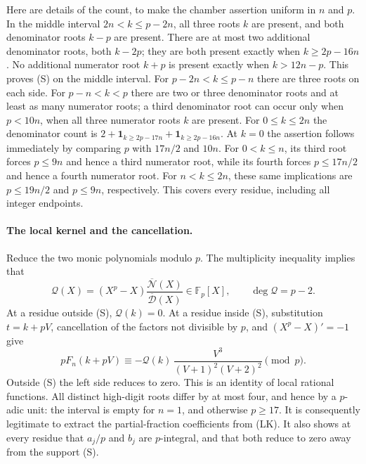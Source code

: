 \documentclass[11pt]{article}
\begin{document}
Here are details of the count, to make the chamber assertion uniform in
$n$ and $p$.  In the middle interval $2n<k\le p-2n$, all three roots $k$
are present, and both denominator roots $k-p$ are present.  There are at
most two additional denominator roots, both $k-2p$; they are both present
exactly when $k\ge2p-16n$.  No additional numerator root $k+p$ is present
exactly when $k>12n-p$.  This proves (S) on the middle interval.
For $p-2n<k\le p-n$ there are three roots on each side.  For $p-n<k<p$
there are two or three denominator roots and at least as many numerator
roots; a third denominator root can occur only when $p<10n$, when all
three numerator roots $k$ are present.
For $0\le k\le2n$ the denominator count is
$2+\mathbf1_{k\ge2p-17n}+\mathbf1_{k\ge2p-16n}$.
At $k=0$ the assertion follows immediately by comparing $p$ with
$17n/2$ and $10n$.  For $0<k\le n$, its third root forces $p\le9n$ and
hence a third numerator root, while its fourth forces $p\le17n/2$ and
hence a fourth numerator root.  For $n<k\le2n$, these same implications
are $p\le19n/2$ and $p\le9n$, respectively.  This covers every residue,
including all integer endpoints.

\paragraph{The local kernel and the cancellation.}
Reduce the two monic polynomials modulo $p$.  The multiplicity inequality
implies that
\[
 \mathcal Q(X)=(X^p-X)\frac{\overline{\mathcal N}(X)}
                               {\overline{\mathcal D}(X)}
             \in\mathbb F_p[X],\qquad \deg\mathcal Q=p-2.
\]
At a residue outside (S), $\mathcal Q(k)=0$.  At a residue inside (S),
substitution $t=k+pV$, cancellation of the factors not divisible by $p$,
and $(X^p-X)'=-1$ give
\[
 pF_n(k+pV)\equiv-\mathcal Q(k)\,
       \frac{V^3}{(V+1)^2(V+2)^2}\pmod p.               \tag{LK}
\]
Outside (S) the left side reduces to zero.  This is an identity of local
rational functions.  All distinct high-digit roots differ by at most
four, and hence by a $p$-adic unit: the interval is empty for $n=1$, and
otherwise $p\ge17$.  It is consequently legitimate to extract the
partial-fraction coefficients from (LK).  It also shows at every residue
that $a_j/p$ and $b_j$ are $p$-integral, and that both reduce to zero away
from the support (S).
\end{document}
